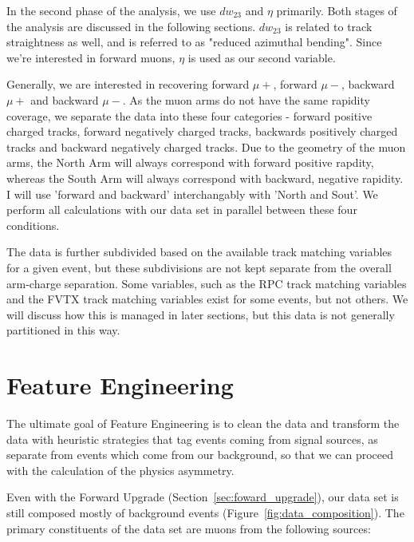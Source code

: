 In the second phase of the analysis, we use $dw_{23}$ and $\eta$ primarily. Both
stages of the analysis are discussed in the following sections. $dw_{23}$ is
related to track straightness as well, and is referred to as "reduced azimuthal
bending". Since we're interested in forward muons, $\eta$ is used as our second
variable.

Generally, we are interested in recovering forward $\mu+$, forward $\mu-$,
backward $\mu+$ and backward $\mu-$. As the muon arms do not have the same
rapidity coverage, we separate the data into these four categories - forward
positive charged tracks, forward negatively charged tracks, backwards positively
charged tracks and backward negatively charged tracks. Due to the geometry of
the muon arms, the North Arm will always correspond with forward positive
rapdity, whereas the South Arm will always correspond with backward, negative
rapidity. I will use 'forward and backward' interchangably with 'North and
Sout'. We perform all calculations with our data set in parallel between these
four conditions.

The data is further subdivided based on the available track matching variables
for a given event, but these subdivisions are not kept separate from the
overall arm-charge separation. Some variables, such as the RPC track matching
variables and the FVTX track matching variables exist for some events, but not
others. We will discuss how this is managed in later sections, but this data is
not generally partitioned in this way.

\clearpage
\section{Feature Engineering}
The ultimate goal of Feature Engineering is to clean the data and transform the
data with heuristic strategies that tag events coming from signal sources, as
separate from events which come from our background, so that we can proceed with
the calculation of the physics asymmetry.

Even with the Forward Upgrade (Section~\ref{sec:foward_upgrade}), our data set
is still composed mostly of background events
(Figure~\ref{fig:data_composition}). The primary constituents of the data set
are muons from the following sources:


